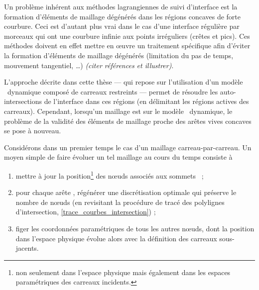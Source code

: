 Un problème inhérent aux méthodes lagrangiennes de suivi d'interface est la formation d'éléments de maillage dégénérés dans les régions concaves de forte courbure. 
Ceci est d'autant plus vrai dans le cas d'une interface régulière par morceaux qui ont une courbure infinie aux points irréguliers (crêtes et pics). Ces méthodes doivent en effet mettre en \oe uvre un traitement spécifique afin d'éviter la formation d'éléments de maillage dégénérés (limitation du pas de temps, mouvement tangentiel, \ldots) \textit{(citer références et illustrer)}.\par 
L'approche décrite dans cette thèse --- qui repose sur l'utilisation d'un modèle \brep\ dynamique composé de carreaux restreints --- permet de résoudre les auto-intersections de l'interface dans ces régions (en délimitant les régions actives des carreaux). 
Cependant, lorsqu'un maillage est  sur le modèle \brep\ dynamique, le problème de la validité des éléments de maillage proche des arêtes vives concaves se pose à nouveau.
\par
%
Considérons dans un premier temps le cas d'un maillage carreau-par-carreau. 
Un moyen simple de faire évoluer un tel maillage au cours du temps consiste à %
\begin{enumerate}
	\item mettre à jour la position\footnote{\label{foot:position_uv_xyz}non seulement dans l'espace physique mais également dans les espaces paramétriques des carreaux incidents.} des n\oe uds associés aux sommets \brep\ ;
	\item pour chaque arête \brep, régénérer une discrétisation optimale qui préserve le nombre de n\oe uds (\eg en revisitant la procédure de tracé des polylignes d'intersection, \cf \autoref{trace_courbes_intersection}) ;
	\item figer les coordonnées paramétriques de tous les autres n\oe uds, dont la position dans l'espace physique évolue alors avec la définition des carreaux sous-jacents.
\end{enumerate}
